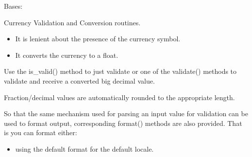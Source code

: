 \documentclass[letterpaper,10pt,english]{sphinxmanual}
\begin{document}
\begin{fulllineitems}
\label{\detokenize{apache_commons_validator_python.routines:apache_commons_validator_python.routines.currency_validator.CurrencyValidator}}
\pysigstartsignatures
{}
\pysigstopsignatures
\sphinxAtStartPar
Bases: {\hyperref[\detokenize{apache_commons_validator_python.routines:apache_commons_validator_python.routines.big_decimal_validator.BigDecimalValidator}]{}}

\sphinxAtStartPar
Currency Validation and Conversion routines.
\begin{description}
\begin{itemize}
\item {} 
\sphinxAtStartPar
It is lenient about the presence of the currency symbol.

\item {} 
\sphinxAtStartPar
It converts the currency to a float.

\end{itemize}

\end{description}

\sphinxAtStartPar
Use the is\_valid() method to just validate or one of the validate() methods to
validate and receive a converted big decimal value.

\sphinxAtStartPar
Fraction/decimal values are automatically rounded to the appropriate length.

\sphinxAtStartPar
So that the same mechanism used for parsing an input value for validation can be used to format output,
corresponding format() methods are also provided. That is you can format either:
\begin{itemize}
\item {} 
\sphinxAtStartPar
using the default format for the default locale.


\end{itemize}
\end{fulllineitems}
\end{document}
